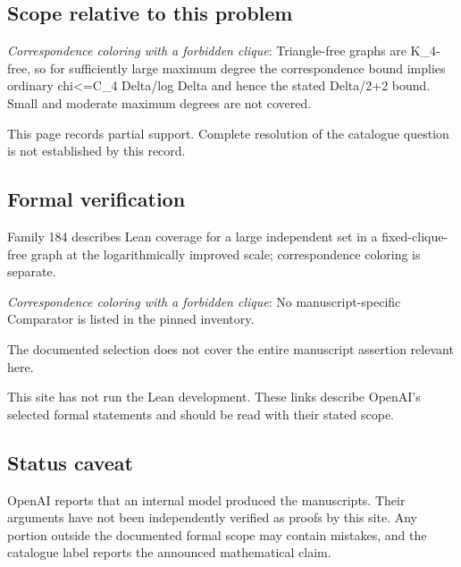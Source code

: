 \documentclass[11pt]{article}
\begin{document}
\subsection{Scope relative to this problem}
\textit{Correspondence coloring with a forbidden clique}: Triangle-free graphs are K\_4-free, so for sufficiently large maximum degree the correspondence bound implies ordinary chi<=C\_4 Delta/log Delta and hence the stated Delta/2+2 bound. Small and moderate maximum degrees are not covered.

This page records partial support. Complete resolution of the catalogue question is not established by this record.

\subsection{Formal verification}
Family 184 describes Lean coverage for a large independent set in a fixed-clique-free graph at the logarithmically improved scale; correspondence coloring is separate.

\textit{Correspondence coloring with a forbidden clique}: No manuscript-specific Comparator is listed in the pinned inventory.

The documented selection does not cover the entire manuscript assertion relevant here.

This site has not run the Lean development. These links describe OpenAI’s selected formal statements and should be read with their stated scope.

\subsection{Status caveat}
OpenAI reports that an internal model produced the manuscripts. Their arguments have not been independently verified as proofs by this site. Any portion outside the documented formal scope may contain mistakes, and the catalogue label reports the announced mathematical claim.
\end{document}
